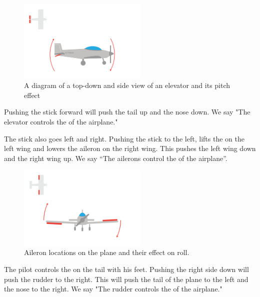 \begin{figure}[htbp]
  \centering
  \includegraphics[width=0.55\textwidth]{elevator.png}
  \caption{A diagram of a top-down and side view of an elevator and its pitch effect}\label{fig:elevator}
\end{figure}

Pushing the stick forward will push the tail up and the nose down. We say "The elevator controls the  of the airplane."

The stick also goes left and right. Pushing the stick to the left, lifts the  on the left wing and lowers the aileron on the right wing. This pushes the left wing down and
the right wing up. We say ``The ailerons control the  of the airplane''.

\begin{figure}[htbp]
  \centering
  \includegraphics[width=0.55\textwidth]{ailerons.png}
  \caption{Aileron locations on the plane and their effect on roll.}
  \label{fig:ailerons}
\end{figure}



The pilot controls the  on the tail with his feet. Pushing the right side down will push the rudder to the right. This will push the tail of the plane to the left and the
nose to the right. We say "The rudder controls the  of the airplane."

